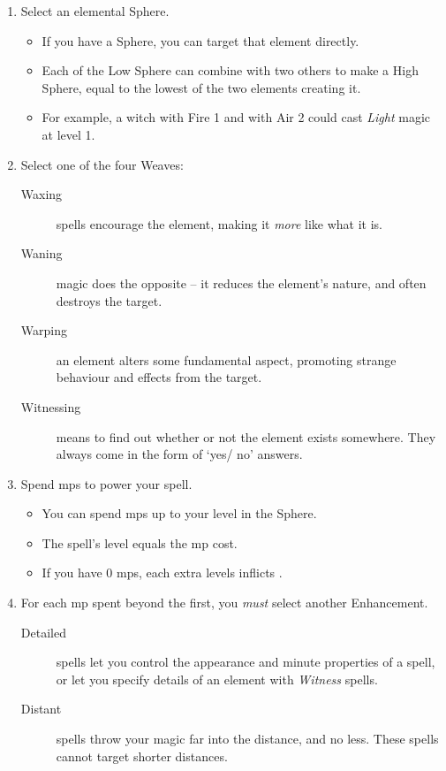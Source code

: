 \begin{multicols}{2}

\begin{enumerate}
  \item
  Select an elemental Sphere.
  \begin{itemize}
    \item
    If you have a Sphere, you can target that element directly.
    \item
    Each of the Low Sphere can combine with two others to make a High Sphere, equal to the lowest of the two elements creating it.
    \item
    For example, a witch with Fire 1 and with Air 2 could cast \textit{Light} magic at level 1.
  \end{itemize}
  \item
  Select one of the four Weaves:
  \begin{description}
    \item[Waxing]
    spells encourage the element, making it \emph{more} like what it is.
    \item[Waning]
    magic does the opposite -- it reduces the element's nature, and often destroys the target.
    \item[Warping]
    an element alters some fundamental aspect, promoting strange behaviour and effects from the target.
    \item[Witnessing]
    means to find out whether or not the element exists somewhere.
    They always come in the form of `yes/ no' answers.
  \end{description}
  \item
  Spend \glspl{mp} to power your spell.
  \begin{itemize}
    \item
    You can spend \glspl{mp} up to your level in the Sphere.
    \item
    The spell's level equals the \gls{mp} cost.
    \item
    If you have 0 \glspl{mp}, each extra levels inflicts .
  \end{itemize}
  \item
  For each \gls{mp} spent beyond the first, you \emph{must} select another Enhancement.
  \begin{description}
    \item[Detailed]
    spells let you control the appearance and minute properties of a spell, or let you specify details of an element with \textit{Witness} spells. 
    \item[Distant]
    spells throw your magic far into the distance, and no less.
    These spells cannot target shorter distances.


\end{description}
\end{enumerate}
\end{multicols}
